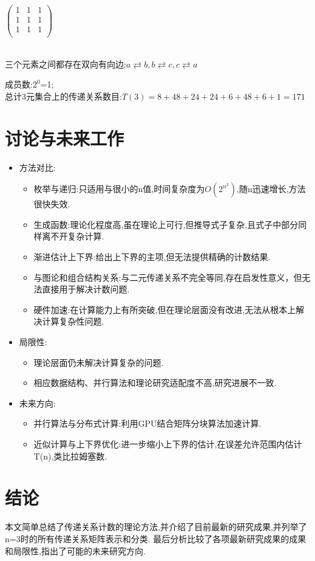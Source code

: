 \documentclass[12pt]{article}
\theoremstyle{definition}
\begin{document}
\begin{center}
$
\begin{pmatrix}
  1 & 1 & 1\\
  1 & 1 & 1\\
  1 & 1 & 1\\
\end{pmatrix}
$\\
\\
三个元素之间都存在双向有向边:$a \rightleftarrows b ,b \rightleftarrows c,c \rightleftarrows a$
\end{center}
成员数:$2^{0}$=1;
\\
\hspace*{2em}总计3元集合上的传递关系数目:$T(3)=8+48+24+24+6+48+6+1=171$
\section{讨论与未来工作}
\begin{itemize}
  \item[$\bullet$] 方法对比:
   \begin{itemize}
  \item[$\bullet$] 枚举与递归:只适用与很小的n值,时间复杂度为$O(2^{n^{2}})$,随n迅速增长,方法很快失效. 
  \item[$\bullet$] 生成函数:理论化程度高,虽在理论上可行,但推导式子复杂,且式子中部分同样离不开复杂计算.
  \item[$\bullet$] 渐进估计上下界:给出上下界的主项,但无法提供精确的计数结果.
  \item[$\bullet$] 与图论和组合结构关系:与二元传递关系不完全等同,存在启发性意义，但无法直接用于解决计数问题.
  \item[$\bullet$] 硬件加速:在计算能力上有所突破,但在理论层面没有改进,无法从根本上解决计算复杂性问题.
\end{itemize}
\item[$\bullet$] 局限性:
\begin{itemize}
  \item[$\bullet$] 理论层面仍未解决计算复杂的问题.
  \item[$\bullet$] 相应数据结构、并行算法和理论研究适配度不高,研究进展不一致.
\end{itemize}
\item[$\bullet$] 未来方向:
\begin{itemize}
  \item[$\bullet$] 并行算法与分布式计算:利用GPU结合矩阵分块算法加速计算.
  \item[$\bullet$] 近似计算与上下界优化:进一步缩小上下界的估计,在误差允许范围内估计T(n),类比拉姆塞数. 
\end{itemize}
\end{itemize}
\section{结论}
本文简单总结了传递关系计数的理论方法,并介绍了目前最新的研究成果,并列举了n=3时的所有传递关系矩阵表示和分类.
最后分析比较了各项最新研究成果的成果和局限性,指出了可能的未来研究方向.


\end{document}
